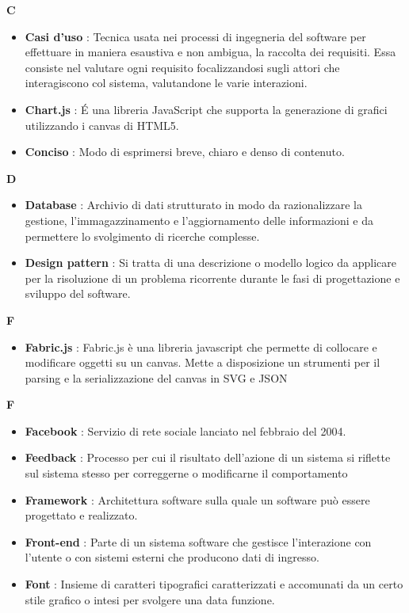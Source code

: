 \newpage
{\huge \textbf{C}}
\begin{flushleft}
\begin{itemize}[label={}]
\item \textbf{Casi d'uso} : Tecnica usata nei processi di ingegneria del software per effettuare in maniera esaustiva e non ambigua, la raccolta dei requisiti. Essa consiste nel valutare ogni requisito focalizzandosi sugli attori che interagiscono col sistema, valutandone le varie interazioni.
\item \textbf{Chart.js} : \'E una libreria JavaScript che supporta la generazione di grafici utilizzando i canvas di HTML5.
\item \textbf{Conciso} : Modo di esprimersi breve, chiaro e denso di contenuto.
\end{itemize}
\end{flushleft}
\newpage
{\huge \textbf{D}}
\begin{flushleft}
	\begin{itemize}[label={}]
		\item \textbf{Database} :  Archivio di dati strutturato in modo da razionalizzare la gestione, l'immagazzinamento e l'aggiornamento delle informazioni e da permettere lo svolgimento di ricerche complesse.
		\item \textbf{Design pattern} : Si tratta di una descrizione o modello logico da applicare per la risoluzione di un problema ricorrente durante le fasi di progettazione e sviluppo del software.
	\end{itemize}
\end{flushleft}
{\huge \textbf{F}}
\begin{flushleft}
\begin{itemize}[label={}]
\item \textbf{Fabric.js} : Fabric.js è una libreria javascript che permette di collocare e modificare oggetti su un canvas. Mette a disposizione un strumenti per il parsing e la serializzazione del canvas in SVG e JSON
\end{itemize}
\end{flushleft}
\newpage
{\huge \textbf{F}}
\begin{flushleft}
\begin{itemize}[label={}]
\item \textbf{Facebook} : Servizio di rete sociale lanciato nel febbraio del 2004.
\item \textbf{Feedback} : Processo per cui il risultato dell'azione di un sistema si riflette sul sistema stesso per correggerne o modificarne il comportamento
\item \textbf{Framework} : Architettura software sulla quale un software può essere progettato e realizzato.
\item \textbf{Front-end} : Parte di un sistema software che gestisce l'interazione con l'utente o con sistemi esterni che producono dati di ingresso.
\item \textbf{Font} : Insieme di caratteri tipografici caratterizzati e accomunati da un certo stile grafico o intesi per svolgere una data funzione.
\end{itemize}
\end{flushleft}
